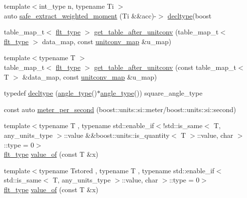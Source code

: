 \begin{DoxyCompactItemize}
\item 
{\footnotesize template$<$int\-\_\-type n, typename Ti $>$ }\\auto \hyperlink{namespaceIceBRG_a5f0b8db01d493c488ad6686af6cd7a2d}{safe\-\_\-extract\-\_\-weighted\-\_\-moment} (Ti \&\&acc)-\/$>$ \hyperlink{namespaceIceBRG_a528e5024ecab03049320529180ae84a8}{decltype}(boost
\item 
table\-\_\-map\-\_\-t$<$ \hyperlink{lib_2IceBRG__main_2common_8h_ad0f130a56eeb944d9ef2692ee881ecc4}{flt\-\_\-type} $>$ \hyperlink{namespaceIceBRG_a2b542305d65147d0b94242382ac56de8}{get\-\_\-table\-\_\-after\-\_\-unitconv} (table\-\_\-map\-\_\-t$<$ \hyperlink{lib_2IceBRG__main_2common_8h_ad0f130a56eeb944d9ef2692ee881ecc4}{flt\-\_\-type} $>$ data\-\_\-map, const \hyperlink{namespaceIceBRG_a7dff9bcf80d56e9e3fc9d9e25c89ae68}{unitconv\-\_\-map} \&u\-\_\-map)
\item 
{\footnotesize template$<$typename T $>$ }\\table\-\_\-map\-\_\-t$<$ \hyperlink{lib_2IceBRG__main_2common_8h_ad0f130a56eeb944d9ef2692ee881ecc4}{flt\-\_\-type} $>$ \hyperlink{namespaceIceBRG_aca898700c1a50aa7fb8481673c56ae98}{get\-\_\-table\-\_\-after\-\_\-unitconv} (const table\-\_\-map\-\_\-t$<$ T $>$ \&data\-\_\-map, const \hyperlink{namespaceIceBRG_a7dff9bcf80d56e9e3fc9d9e25c89ae68}{unitconv\-\_\-map} \&u\-\_\-map)
\item 
typedef \hyperlink{namespaceIceBRG_ae575e298a3ae1c0fd6b40e3b6cf89a25}{decltype} (\hyperlink{namespaceIceBRG_a688eeb0811a2474b20b667ed2e9625a1}{angle\-\_\-type}()$\ast$\hyperlink{namespaceIceBRG_a688eeb0811a2474b20b667ed2e9625a1}{angle\-\_\-type}()) square\-\_\-angle\-\_\-type
\item 
const auto \hyperlink{namespaceIceBRG_a08cdd3f6d83518620b066a3e6c65701d}{meter\-\_\-per\-\_\-second} (boost\-::units\-::si\-::meter/boost\-::units\-::si\-::second)
\item 
{\footnotesize template$<$typename T , typename std\-::enable\-\_\-if$<$!std\-::is\-\_\-same$<$ T, any\-\_\-units\-\_\-type $>$\-::value \&\&boost\-::units\-::is\-\_\-quantity$<$ T $>$\-::value, char $>$\-::type  = 0$>$ }\\\hyperlink{lib_2IceBRG__main_2common_8h_ad0f130a56eeb944d9ef2692ee881ecc4}{flt\-\_\-type} \hyperlink{namespaceIceBRG_a381f2d74ab3585a8e238dbf1d2074a30}{value\-\_\-of} (const T \&x)
\item 
{\footnotesize template$<$typename Tstored , typename T , typename std\-::enable\-\_\-if$<$ std\-::is\-\_\-same$<$ T, any\-\_\-units\-\_\-type $>$\-::value, char $>$\-::type  = 0$>$ }\\\hyperlink{lib_2IceBRG__main_2common_8h_ad0f130a56eeb944d9ef2692ee881ecc4}{flt\-\_\-type} \hyperlink{namespaceIceBRG_ad3ed8ee7dcfd906dbb8eaae25e817cbe}{value\-\_\-of} (const T \&x)

\end{DoxyCompactItemize}
